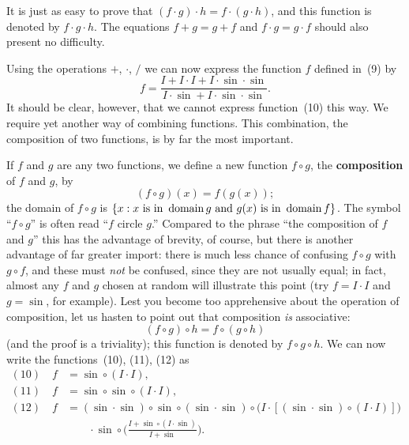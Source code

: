 It is just as easy to prove that $(f \cdot g) \cdot h = f \cdot (g \cdot h)$,
and this function is denoted by $f \cdot g \cdot h$. The equations
$f+g = g+f$ and $f \cdot g = g \cdot f$ should also present no difficulty.

Using the operations $+$, $\cdot$, $/$ we can now express the function $f$
defined in~(9) by
\[
f = \frac{I + I \cdot I + I \cdot \sin \cdot \sin}
{I \cdot \sin + I \cdot \sin \cdot \sin}.
\]
It should be clear, however, that we cannot express function~(10) this way. We
require yet another way of combining functions. This combination, the
composition of two functions, is by far the most important.

If $f$ and $g$ are any two functions, we define a new function $f \circ g$,
the \textbf{composition} of $f$ and $g$, by
\[
(f \circ g)(x) = f(g(x));
\]
the domain of $f \circ g$ is $\{x : x\text{ is in }\operatorname{domain} g\text{ and }g(x)
\text{ is in }\operatorname{domain} f\}$. The symbol ``$f \circ g$'' is often read ``$f$ circle
$g$.'' Compared to the phrase ``the composition of $f$ and $g$'' this has the
advantage of brevity, of course, but there is another advantage of far greater
import: there is much less chance of confusing $f \circ g$ with $g \circ f$,
and these must \emph{not} be confused, since they are not usually equal; in
fact, almost any $f$ and $g$ chosen at random will illustrate this point (try
$f = I \cdot I$ and $g = \sin$, for example). Lest you become too apprehensive
about the operation of composition, let us hasten to point out that
composition \emph{is} associative:
\[
(f \circ g) \circ h = f \circ (g \circ h)
\]
(and the proof is a triviality); this function is denoted by $f \circ g \circ h$.
We can now write the functions~(10), (11), (12) as
\begin{align*}
(10)\quad f &= \sin \circ (I \cdot I),\\
(11)\quad f &= \sin \circ \sin \circ (I \cdot I),\\
(12)\quad f &= (\sin \cdot \sin) \circ \sin \circ (\sin \cdot \sin)
\circ \bigl(I \cdot [(\sin \cdot \sin) \circ (I \cdot I)]\bigr)\\
&\qquad\cdot
\sin \circ \Biggl(\frac{I + \sin \circ (I \cdot \sin)}{I + \sin}\Biggr).
\end{align*}

